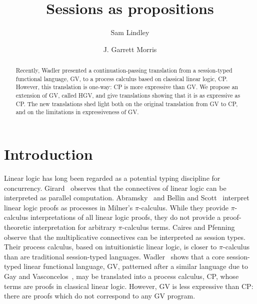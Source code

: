 \documentclass{easychair}
\newcommand{\hgv}{HGV\xspace}
\begin{document}
\title{Sessions as propositions}

\author{
  Sam Lindley
  \and
  J. Garrett Morris
}



\clearpage

\maketitle


\begin{abstract}
  Recently, Wadler presented a continuation-passing translation from a session-typed functional
  language, GV, to a process calculus based on classical linear logic, CP. However, this translation
  is one-way: CP is more expressive than GV. We propose an extension of GV, called \hgv, and give
  translations showing that it is as expressive as CP. The new translations shed light both on the
  original translation from GV to CP, and on the limitations in expressiveness of GV.
\end{abstract}

\section{Introduction}
\label{sect:introduction}

Linear logic has long been regarded as a potential typing discipline for concurrency.
Girard~\cite{Girard87} observes that the connectives of linear logic can be interpreted as parallel
computation. Abramsky~\cite{Abramsky92} and Bellin and Scott~\cite{BellinScott94} interpret linear
logic proofs as processes in Milner's $\pi$-calculus. While they provide $\pi$-calculus
interpretations of all linear logic proofs, they do not provide a proof-theoretic interpretation for
arbitrary $\pi$-calculus terms. Caires and Pfenning~\cite{CairesPfenning10} observe that the
multiplicative connectives can be interpreted as session types. Their process calculus, based on
intuitionistic linear logic, is closer to $\pi$-calculus than are traditional session-typed
languages. Wadler~\cite{Wadler12} shows that a core session-typed linear functional language, GV,
patterned after a similar language due to Gay and Vasconcelos~\cite{GayVasconcelos10}, may be
translated into a process calculus, CP, whose terms are proofs in classical linear logic.  However,
GV is less expressive than CP: there are proofs which do not correspond to any GV program.
\end{document}
